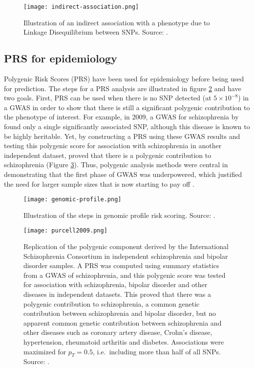 \begin{figure}[htb]
\centerline{\texttt{[image: indirect-association.png]}}
\caption{Illustration of an indirect association with a phenotype due to Linkage Disequilibrium between SNPs. Source: \cite{astle2009population}.}\label{fig:gwasLD}
\end{figure}

\subsection{PRS for epidemiology}

Polygenic Risk Scores (PRS) have been used for epidemiology before being used for prediction. The steps for a PRS analysis are illustrated in figure \ref{fig:steps-PRS} and have two goals. 
First, PRS can be used when there is no SNP detected (at $5 \times 10^{-8}$) in a GWAS in order to show that there is still a significant polygenic contribution to the phenotype of interest. 
For example, in 2009, a GWAS for schizophrenia by \cite{purcell2009common} found only a single significantly associated SNP, although this disease is known to be highly heritable. Yet, by constructing a PRS using these GWAS results and testing this polygenic score for association with schizophrenia in another independent dataset, \cite{purcell2009common} proved that there is a polygenic contribution to schizophrenia (Figure \ref{fig:epi-PRS}). 
Thus, polygenic analysis methods were central in demonstrating that the first phase of GWAS was underpowered, which justified the need for larger sample sizes that is now starting to pay off \cite[]{wray2014research}.

\begin{figure}[htb]
\centerline{\texttt{[image: genomic-profile.png]}}
\caption{Illustration of the steps in genomic profile risk scoring. Source: \cite{wray2014research}.}\label{fig:steps-PRS}
\end{figure}

\begin{figure}[htb]
\centerline{\texttt{[image: purcell2009.png]}}
\caption{Replication of the polygenic component derived by the International Schizophrenia Consortium in independent schizophrenia and bipolar disorder samples. A PRS was computed using summary statistics from a GWAS of schizophrenia, and this polygenic score was tested for association with schizophrenia, bipolar disorder and other diseases in independent datasets. This proved that there was a polygenic contribution to schizophrenia, a common genetic contribution between schizophrenia and bipolar disorder, but no apparent common genetic contribution between schizophrenia and other diseases such as coronary artery disease, Crohn's disease, hypertension, rheumatoid arthritis and diabetes. Associations were maximized for $p_T = 0.5$, i.e.\ including more than half of all SNPs. Source: \cite{purcell2009common}.}\label{fig:epi-PRS}
\end{figure}

